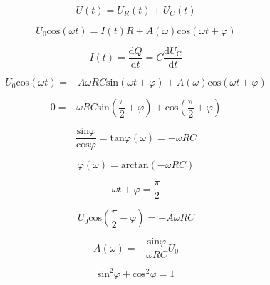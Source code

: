         \begin{equation}
            U(t) = U_R(t) + U_C(t)
        \end{equation}

        \begin{equation}
            U_0 \text{cos}(\omega t) = I(t)R + A(\omega) \text{cos}(\omega t + \varphi)
        \end{equation}

        \begin{equation}
            I(t) = \frac{\text{d}Q}{\text{d}t} = C \frac{\text{d}U_\text{C}}{\text{d}t}
        \end{equation}

        \begin{equation}
            U_0 \text{cos}(\omega t) = -A\omega R C \text{sin}(\omega t + \varphi) + A(\omega) \text{cos}(\omega t + \varphi)
        \end{equation}

        \begin{equation}
            0 = -\omega R C \text{sin} \left( \frac{\pi}{2} + \varphi \right) + \text{cos} \left( \frac{\pi}{2} + \varphi \right)
        \end{equation}

        \begin{equation}
            \frac{\text{sin} \varphi}{\text{cos} \varphi} = \text{tan} \varphi (\omega) = -\omega RC 
        \end{equation}

        \begin{equation}
            \varphi (\omega) = \text{arctan} ( - \omega R C)
        \end{equation}

        \begin{equation}
            \omega t + \varphi = \frac{\pi}{2}
        \end{equation}

        \begin{equation}
            U_0 \text{cos}(\frac{\pi}{2} - \varphi) = -A \omega R C 
        \end{equation}

        \begin{equation}
            A(\omega) = - \frac{\text{sin} \varphi}{\omega R C} U_0
        \end{equation}

        \begin{equation}
            \text{sin}^2 \varphi + \text{cos}^2 \varphi = 1
        \end{equation}

